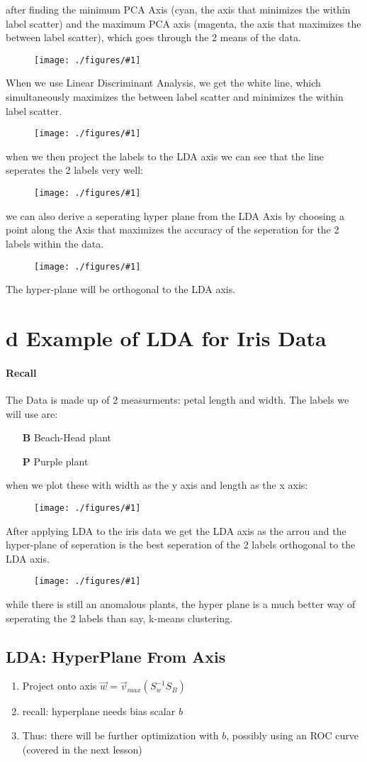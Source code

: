 \documentclass[12pt]{book}
\newcommand{\incimg}[2]{%
       \begin{figure}[h]
               \centering
               \texttt{[image: ./figures/\#1]}
       \end{figure}
}
\begin{document}
after finding the minimum PCA Axis (cyan, the axis that minimizes the within label scatter) 
and the maximum PCA axis (magenta, the axis that maximizes the between 
label scatter), which goes through the 2 means of the data.
\incimg{data2PCA}{0.5}

When we use Linear Discriminant Analysis, we get the white line, which simultaneously maximizes
the between label scatter and minimizes the within label scatter.
\incimg{data2LDA}{0.5}
\pagebreak

when we then project the labels to the LDA axis we can see that the line seperates the
2 labels very well:
\incimg{data2project}{0.5}

we can also derive a seperating hyper plane from the LDA Axis by choosing a point
along the Axis that maximizes the accuracy of the seperation for
the 2 labels within the data.
\incimg{data2part}{0.5}

The hyper-plane will be orthogonal to the LDA axis.

\section*{d Example of LDA for Iris Data}
\paragraph{Recall}
The Data is made up of 2 measurments: petal length and width. The labels we will use 
are:
\begin{itemize}
        \item[\textbf{B}] Beach-Head plant
        \item[\textbf{P}] Purple plant
\end{itemize}
\pagebreak

when we plot these with width as the y axis and length as the x axis:
\incimg{irisData}{0.5}

After applying LDA to the iris data we get the LDA axis as the arrou and the hyper-plane
of seperation is the best seperation of the 2 labels orthogonal to the LDA axis.
\incimg{irisLDA}{0.5}

while there is still an anomalous plants, the hyper plane is a much better way of seperating 
the 2 labels than say, k-means clustering.

\subsection*{LDA: HyperPlane From Axis}
\begin{enumerate}
        \item Project onto axis $\vec w = \vec v_{max}(S_w^{-1} S_B)$
        \item recall: hyperplane needs bias scalar $b$
        \item Thus: there will be further optimization with $b$, possibly using 
                an ROC curve (covered in the next lesson)
\end{enumerate}
\end{document}
